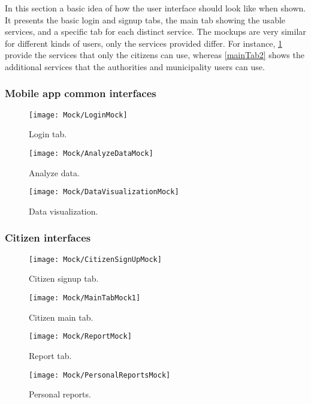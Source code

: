 In this section a basic idea of how the user interface should look like when shown. It presents the basic login and signup tabs, the main tab showing the usable services, and a specific tab for each distinct service. The mockups are very similar for different kinds of users, only the services provided differ. For instance, \ref{mainTab1} provide the services that only the citizens can use, whereas \ref{mainTab2} shows the additional services that the authorities and municipality users can use.

\subsubsection{Mobile app common interfaces}

\begin{figure}[H]
	\centering
	\begin{minipage}[b]{0.38\linewidth}
		\texttt{[image: Mock/LoginMock]}
	    \caption{Login tab.}
	\end{minipage}
	
\end{figure}

\begin{figure}[H]
	\centering
		\begin{minipage}[b]{0.38\linewidth}
		\texttt{[image: Mock/AnalyzeDataMock]}
		\caption{Analyze data.}
	\end{minipage}
	\begin{minipage}[b]{0.38\linewidth}
		\texttt{[image: Mock/DataVisualizationMock]}
		\caption{Data visualization.}
	\end{minipage}
\end{figure}

\subsubsection{Citizen interfaces}

\begin{figure}[H]
	\centering
	\begin{minipage}[b]{0.38\linewidth}
	    \texttt{[image: Mock/CitizenSignUpMock]}
	    \caption{Citizen signup tab.}
	\end{minipage}
	\begin{minipage}[b]{0.38\linewidth}
		\texttt{[image: Mock/MainTabMock1]}
		\caption{Citizen main tab.}
		\label{mainTab1}
	\end{minipage}
	\begin{minipage}[b]{0.38\linewidth}
		\texttt{[image: Mock/ReportMock]}
		\caption{Report tab.}
	\end{minipage}
	\begin{minipage}[b]{0.38\linewidth}
		\texttt{[image: Mock/PersonalReportsMock]}
		\caption{Personal reports.}
	\end{minipage}	
\end{figure}


